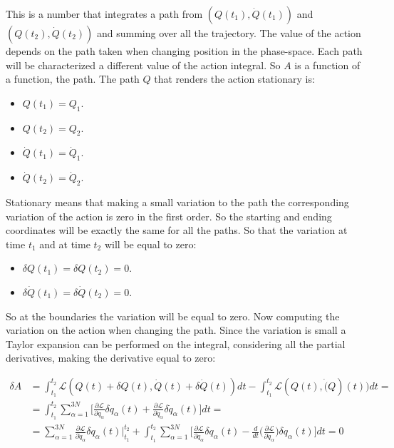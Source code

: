 	This is a number that integrates a path from $(Q(t_1), \dot{Q}(t_1))$ and $(Q(t_2), \dot{Q}(t_2))$ and summing over all the trajectory.
	The value of the action depends on the path taken when changing position in the phase-space.
	Each path will be characterized a different value of the action integral.
	So $A$ is a function of a function, the path.
	The path $Q$ that renders the action stationary is:

	\begin{multicols}{4}
		\begin{itemize}
			\item $Q(t_1) = Q_1$.
			\item $Q(t_2) = Q_2$.
			\item $\dot{Q}(t_1) = \dot{Q}_1$.
			\item $\dot{Q}(t_2) = \dot{Q}_2$.
		\end{itemize}
	\end{multicols}

	Stationary means that making a small variation to the path the corresponding variation of the action is zero in the first order.
	So the starting and ending coordinates will be exactly the same for all the paths.
	So that the variation at time $t_1$ and at time $t_2$ will be equal to zero:

	\begin{multicols}{2}
		\begin{itemize}
			\item $\delta Q(t_1) = \delta Q(t_2) = 0$.
			\item $\delta\dot{Q}(t_1) = \delta\dot{Q}(t_2) = 0$.
		\end{itemize}
	\end{multicols}

	So at the boundaries the variation will be equal to zero.
	Now computing the variation on the action when changing the path.
	Since the variation is small a Taylor expansion can be performed on the integral, considering all the partial derivatives, making the derivative equal to zero:

	\begin{align*}
		\delta A &= \int_{t_1}^{t_2}\mathcal{L}(Q(t) + \delta Q(t), \dot{Q}(t)+\delta\dot{Q}(t))dt - \int_{t_1}^{t_2}\mathcal{L}(Q(t), \dot(Q)(t))dt = \\
						 &=\int_{t_1}^{t_2}\sum\limits_{\alpha=1}^{3N}\biggl[\frac{\partial\mathcal{L}}{\partial q_\alpha}\delta q_\alpha(t) + \frac{\partial\mathcal{L}}{\partial\dot{q}_\alpha}\delta\dot{q}_\alpha(t)\biggr]dt=\\
						 &=\sum\limits_{\alpha=1}^{3N}\frac{\partial\mathcal{L}}{\partial\dot{q}_\alpha}\delta q_\alpha(t)|_{t_1}^{t_2} + \int_{t_1}^{t_2}\sum\limits_{\alpha=1}^{3N}\biggl[\frac{\partial\mathcal{L}}{\partial q_\alpha}\delta q_\alpha(t) - \frac{d}{dt}\biggl(\frac{\partial\mathcal{L}}{\partial\dot{q}_\alpha}\biggr)\delta q_\alpha(t)\biggr] dt = 0
	\end{align*}


